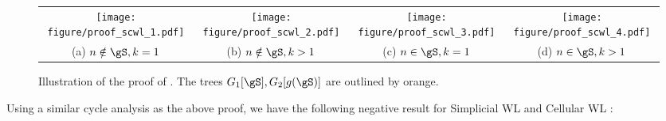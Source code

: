 \documentclass{article} %
\let\cref\crtcref
\begin{document}
\begin{figure}[t]
    \centering
    \small
    \begin{tabular}{cccc}
        \hspace{-6pt}\texttt{[image: figure/proof\_scwl\_1.pdf]}\hspace{-6pt} & \hspace{-6pt}\texttt{[image: figure/proof\_scwl\_2.pdf]}\hspace{-3pt} & \hspace{-3pt}\texttt{[image: figure/proof\_scwl\_3.pdf]}\hspace{-6pt} & \hspace{-6pt}\texttt{[image: figure/proof\_scwl\_4.pdf]}\hspace{-6pt}\\
        \hspace{-6pt}(a) $n\notin\gS,k=1$\hspace{-6pt} & (b) $n\notin\gS,k>1$ & \hspace{-6pt}(c) $n\in\gS,k=1$\hspace{-6pt} & (d) $n\in\gS,k>1$
    \end{tabular}
    \vspace{-7pt}
    \caption{Illustration of the proof of \cref{thm:scwl}. The trees $G_1[\gS], G_2[g(\gS)]$ are outlined by orange.}
    \label{fig:proof_scwl}
    \vspace{-12pt}
\end{figure}

Using a similar cycle analysis as the above proof, we have the following negative result for Simplicial WL \citep{bodnar2021topological} and Cellular WL \citep{bodnar2021cellular}:
\end{document}
